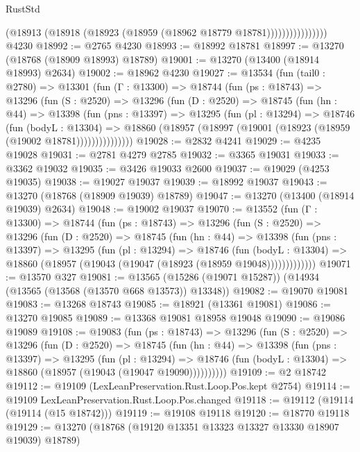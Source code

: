\begin{lexlean}{RustStd}
\begin{coremodule}
                          (@18913 (@18918 (@18923 (@18959 (@18962 @18779 @18781))))))))))))))))
    @4230
@18992 := @2765 @4230
@18993 := @18992 @18781
@18997 := @13270 (@18768 (@18909 @18993) @18789)
@19001 := @13270 (@13400 (@18914 @18993) @2634)
@19002 := @18962 @4230
@19027 := @13534
    (fun (tail0 : @2780) =>
    @13301
      (fun (Γ : @13300) =>
      @18744
        (fun (ps : @18743) =>
        @13296
          (fun (S : @2520) =>
          @13296
            (fun (D : @2520) =>
            @18745
              (fun (hn : @44) =>
              @13398
                (fun (pns : @13397) =>
                @13295
                  (fun (pl : @13294) =>
                  @18746
                    (fun (bodyL : @13304) =>
                    @18860 (@18957 (@18997 (@19001 (@18923 (@18959 (@19002 @18781)))))))))))))))
@19028 := @2832 @4241
@19029 := @4235 @19028
@19031 := @2781 @4279 @2785
@19032 := @3365 @19031
@19033 := @3362 @19032
@19035 := @3426 @19033 @2600
@19037 := @19029 (@4253 @19035)
@19038 := @19027 @19037
@19039 := @18992 @19037
@19043 := @13270 (@18768 (@18909 @19039) @18789)
@19047 := @13270 (@13400 (@18914 @19039) @2634)
@19048 := @19002 @19037
@19070 := @13552
    (fun (Γ : @13300) =>
    @18744
      (fun (ps : @18743) =>
      @13296
        (fun (S : @2520) =>
        @13296
          (fun (D : @2520) =>
          @18745
            (fun (hn : @44) =>
            @13398
              (fun (pns : @13397) =>
              @13295
                (fun (pl : @13294) =>
                @18746
                  (fun (bodyL : @13304) =>
                  @18860 (@18957 (@19043 (@19047 (@18923 (@18959 @19048)))))))))))))
@19071 := @13570 @327
@19081 := @13565 (@15286 (@19071 @15287)) (@14934 (@13565 (@13568 (@13570 @668 @13573)) @13348))
@19082 := @19070 @19081
@19083 := @13268 @18743
@19085 := @18921 (@13361 @19081)
@19086 := @13270 @19085
@19089 := @13368 @19081 @18958 @19048
@19090 := @19086 @19089
@19108 := @19083
    (fun (ps : @18743) =>
    @13296
      (fun (S : @2520) =>
      @13296
        (fun (D : @2520) =>
        @18745
          (fun (hn : @44) =>
          @13398
            (fun (pns : @13397) =>
            @13295
              (fun (pl : @13294) =>
              @18746 (fun (bodyL : @13304) => @18860 (@18957 (@19043 (@19047 @19090))))))))))
@19109 := @2 @18742
@19112 := @19109 (LexLeanPreservation.Rust.Loop.Pos.kept @2754)
@19114 := @19109 LexLeanPreservation.Rust.Loop.Pos.changed
@19118 := @19112 (@19114 (@19114 (@15 @18742)))
@19119 := @19108 @19118
@19120 := @18770 @19118
@19129 := @13270 (@18768 (@19120 @13351 @13323 @13327 @13330 @18907 @19039) @18789)

\end{coremodule}
\end{lexlean}

